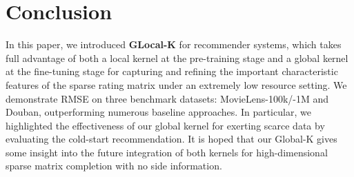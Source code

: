 \documentclass[sigconf]{acmart}
\begin{document}
\section{Conclusion}
In this paper, we introduced \textbf{GLocal-K} for recommender systems, which takes full advantage of both a local kernel at the pre-training stage and a global kernel at the fine-tuning stage for capturing and refining the important characteristic features of the sparse rating matrix under an extremely low resource setting. We demonstrate RMSE on three benchmark datasets: MovieLens-100k/-1M and Douban, outperforming numerous baseline approaches. In particular, we highlighted the effectiveness of our global kernel for exerting scarce data by evaluating the cold-start recommendation. It is hoped that our Global-K gives some insight into the future integration of both kernels for high-dimensional sparse matrix completion with no side information.




\balance

\end{document}
